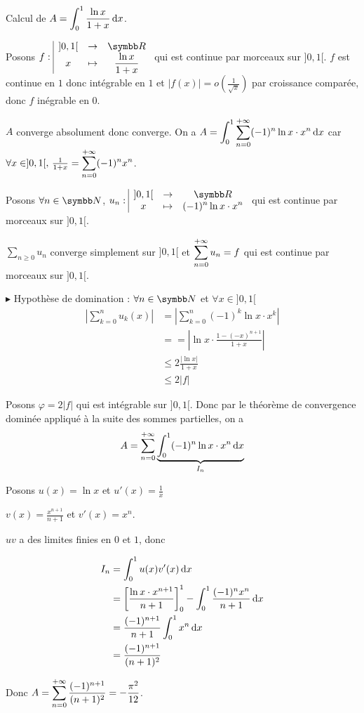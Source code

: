 \begin{exemple}
    Calcul de $A = \displaystyle \int_0^1 \frac{\ln x}{1 + x} \,\mathrm{d}x$.

    Posons $\fonction f{]0, 1[}{\R}{x}{\frac{\ln x}{1 + x}}$ 
    qui est continue par morceaux sur $]0, 1[$. $f$ est continue en $1$ donc intégrable en $1$
    et $|f(x)| = o\left(\frac 1 {\sqrt x} \right)$ par croissance comparée, donc $f$ inégrable en $0$. 

    $A$ converge absolument donc converge. On a $\displaystyle A = \int_{0}^{1 } \sum_{n = 0}^{+ \infty} (-1)^n \ln x \cdot x^n \,\mathrm{d}x$
    car $\forall x \in ]0, 1[, \, \frac 1 {1 + x} = \displaystyle \sum_{n = 0}^{+ \infty} (-1)^n x^n$.

    Posons $\forall n \in \N$, $\fonction {u_n}{]0, 1[}{\R}{x}{(-1)^n \ln x \cdot x^n}$ qui est continue par morceaux sur $]0, 1[$.

    $\sum_{n \geqslant 0} u_n$ converge simplement sur $]0, 1[$ et $\displaystyle \sum_{n = 0}^{+ \infty} u_n = f$ qui est continue par morceaux sur $]0, 1[$.

    \avspace $\blacktriangleright$ Hypothèse de domination : $\forall n \in \N$ et $\forall 
    x \in ]0, 1[$\begin{align}
        \left| \sum_{k = 0 }^{n } u_k(x) \right| & = \left| \sum_{k = 0}^{n } (-1)^k \ln x \cdot x^k \right| \\
        & == \left| \ln x \cdot \frac{1 - (-x)^{n + 1}}{1 + x} \right| \\
        & \leqslant 2 \frac{|\ln x|}{1+x} \\
        & \leqslant 2 |f|
    \end{align}

    Posons $\varphi = 2 |f|$ qui est intégrable sur $]0, 1[$. Donc par le théorème de convergence dominée 
    appliqué à la suite des sommes partielles, on a 
    $$A = \sum_{n=0}^{+ \infty} \underbrace{\int_{0}^{1} (-1)^n \ln x \cdot x^n \,\mathrm{d}x}_{I_n}$$

    Posons $u(x) = \ln x$ et $u'(x) = \frac 1 x$ 

    $v(x) = \frac{x^{n + 1}}{n + 1}$ et $v'(x) = x^n$.

    $uv$ a des limites finies en $0$ et $1$, donc 
    
    \begin{align}
    I_n & = \int_0^1 u(x) v'(x) \,\mathrm{d}x \\
    & = \left[ \frac{\ln x \cdot x^{n+1}}{n + 1} \right]_0^1 - \int_0^1 \frac{(-1)^nx^n}{n+1} \,\mathrm{d}x \\
    & = \frac{(-1)^{n+1}}{n + 1} \int_0^1 x^n \,\mathrm{d}x \\
    & = \frac{(-1)^{n+1}}{(n + 1)^2}
    \end{align}

    Donc $A = \displaystyle \sum_{n = 0 }^{+ \infty} \frac{(-1)^{n+1}}{(n + 1)^2} = - \frac{\pi^2}{12}$.

\end{exemple}

